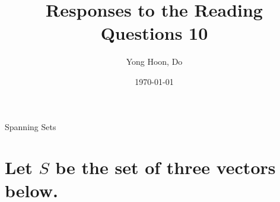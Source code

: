 \documentclass{article}
\title{Responses to the Reading Questions 10}
\author{Yong Hoon, Do}
\date{\today}
\begin{document}
\maketitle

\begin{center}
Spanning Sets
\end{center}

\newcommand{\sol} {
  \textbf{Solution:}
}

\newcommand{\LIVHS} {\textbf{Linearly Independent Vectors and Homogeneous Systems}}

\newcommand{\FVCS} {\textbf{Free Variables for Consistent Systems}}

\newcommand{\HSC} {\textbf{Homogeneous Systems are Consistent}}

\newcommand{\ls} {
\(\mathcal{LS}(A,\textbf{0})\)
}

\section{Let \(S\) be the set of three vectors below.}
\newcommand{\exone}{
  S=
  \left\{
  \left|
  \begin{array}{c}
    1 \\
    2 \\
    -1 \\
  \end{array}
  \right|
  ,
  \left|
  \begin{array}{c}
    3 \\
    -4 \\
    2 \\
  \end{array}
  \right|
  ,
  \left|
  \begin{array}{c}
    4 \\
    -2 \\
    1 \\
  \end{array}
  \right|
  \right\}
}

\newcommand{\extwo}{
  S=
  \left\{
  \left|
  \begin{array}{c}
    1 \\
    -1 \\
    0 \\
  \end{array}
  \right|
  ,
  \left|
  \begin{array}{c}
    3 \\
    2 \\
    2 \\
  \end{array}
  \right|
  ,
  \left|
  \begin{array}{c}
    4 \\
    4 \\
    -4 \\
  \end{array}
  \right|
  \right\}
}
\end{document}
